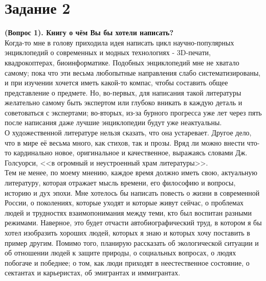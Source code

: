 \documentclass[a4paper,12pt]{article} %
\begin{document}
\section{Задание 2}
\textbf{(Вопрос 1). Книгу о чём Вы бы хотели написать?} \\
Когда-то мне в голову приходила идея написать цикл научно-популярных энциклопедий о современных и модных технологиях - 3D-печати, квадрокоптерах, биоинформатике. Подобных энциклопедий мне не хватало самому; пока что эти весьма любопытные направления слабо систематизированы, и при изучении хочется иметь какой-то компас, чтобы составить общее представление о предмете. Но, во-первых, для написания такой литературы желательно самому быть экспертом или глубоко вникать в каждую деталь и советоваться с экспертами; во-вторых, из-за бурного прогресса уже лет через пять после написания даже лучшие энциклопедии будут уже неактуальны.\\
О художественной литературе нельзя сказать, что она устаревает. Другое дело, что в мире её весьма много, как стихов, так и прозы. Вряд ли можно внести что-то кардинально новое, оригинальное и качественное, выражаясь словами Дж. Голсуорси, <<в огромный и неустроенный храм литературы>>.\\
Тем не менее, по моему мнению, каждое время должно иметь свою, актуальную литературу, которая отражает мысль времени, его философию и вопросы, историю и дух эпохи.  Мне хотелось бы написать повесть о жизни в современной России, о поколениях, которые уходят и которые живут сейчас, о проблемах людей и трудностях взаимопонимания между теми, кто был воспитан разными режимами. Наверное, это будет отчасти автобиографический труд, в котором я бы хотел изобразить хороших людей, которых я знаю и которых хочу поставить в пример другим. Помимо того, планирую рассказать об экологической ситуации и об отношении людей к защите природы, о социальных вопросах, о людях побогаче и победнее; о том, как люди приходят в неестественное состояние, о сектантах и карьеристах, об эмигрантах и иммигрантах.\\

\newpage
\end{document}
